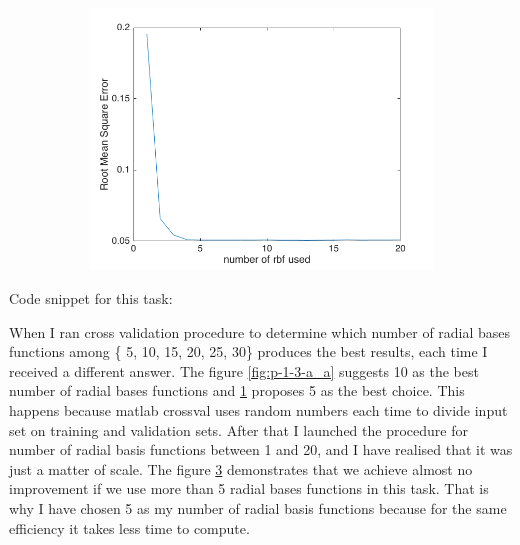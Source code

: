 \documentclass{article}
\begin{document}
\begin{enumerate}[label=(\alph*)]
\begin{figure}[t]
\begin{subfigure}{0.5\textwidth}
				 			\caption{}
				 			\label{fig:p-1-3-a_b}
				 		\end{subfigure}\\
				 		\begin{subfigure}{0.5\textwidth}
				 			\includegraphics[width=\linewidth]{images/p1-3-a_1_20.png}
				 			\caption{}
				 			\label{fig:p-1-3-a_c}
				 		\end{subfigure}

				 	\end{figure}	
				 	Code snippet for this task:
				 	
				 	When I ran cross validation procedure to determine which number of radial bases functions among \{ 5, 10, 15, 20, 25, 30\}  produces the best results, each time I received a different answer.  The figure \ref{fig:p-1-3-a_a} suggests 10 as the best number of radial bases functions and \ref{fig:p-1-3-a_b} proposes 5 as the best choice. This happens because matlab crossval uses random numbers each time to divide input set on training and validation sets. After that I launched the procedure for number of radial basis functions between 1 and 20, and I have realised that it was just a matter of scale. The figure \ref{fig:p-1-3-a_c} demonstrates that we achieve almost no improvement if we use more than 5 radial bases functions in this task. That is why I have chosen 5 as my number of radial basis functions because for the same efficiency it takes less time to compute.
				 	

\end{enumerate}
\end{document}
